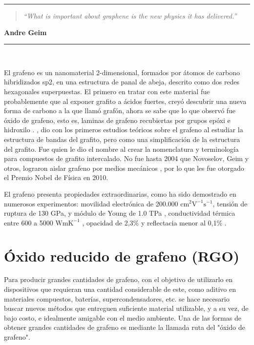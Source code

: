 \noindent
\rule{\linewidth}{1 pt}
\begin{flushright}
	\begin{quotation}
		\small{
			\textit{``What is important about graphene is the new physics it has delivered.''}}
	\end{quotation}
	\bf{Andre Geim}
\end{flushright}
\noindent
\rule{\linewidth}{1 pt}\\
\vfill

El grafeno es un nanomaterial 2-dimensional, formados por átomos de carbono  hibridizados sp2, en una estructura de panal de abeja, descrito como dos redes hexagonales superpuestas. El primero en tratar con este material fue probablemente \citet{Brodie1859} que al exponer grafito a ácidos fuertes, creyó descubrir una nueva forma de carbono a la que llamó grafón, ahora se sabe que lo que observó fue óxido de grafeno, esto es, laminas de grafeno recubiertas por grupos epóxi e hidroxilo \citep{Geim2012}. \citet{Wallace1947}, dio con los primeros estudios teóricos sobre el grafeno al estudiar la estructura de bandas del grafito, pero como una simplificación de la estructura del grafito. Fue \citet{Boehm1986} quien le dio el nombre al crear la nomenclatura y terminología para compuestos de grafito intercalado. No fue hasta 2004 que Novoselov, Geim y otros, lograron aislar grafeno por medios mecánicos \citep{Novoselov2004}, por lo que les fue otorgado el Premio Nobel de Física en 2010.

El grafeno presenta propiedades extraordinarias, como ha sido demostrado en numerosos experimentos: movilidad electrónica de 200.000 $\mathrm{cm^2 V^{-1} s^{-1} }$\citep{Bolotin2008}, tensión de ruptura de 130 GPa, y módulo de Young de 1.0 TPa \citep{Lee2008}, conductividad térmica entre 600 a 5000 $\mathrm{W mK^{-1}}$ \citep{Balandin2011}, opacidad de 2,3\% y reflectacia menor al 0,1\% \citep{Nair2008}.

\section{Óxido reducido de grafeno (RGO)}
Para producir grandes cantidades de grafeno, con el objetivo de utilizarlo en dispositivos que requieran una cantidad considerable de este, como aditivo en materiales compuestos, baterías, supercondensadores, etc. se hace necesario buscar nuevos métodos que entreguen suficiente material utilizable, y a su vez, de bajo costo, e idealmente amigable con el medio ambiente.
Una de las formas de obtener grandes cantidades de grafeno es mediante la llamada ruta del "óxido de grafeno".

